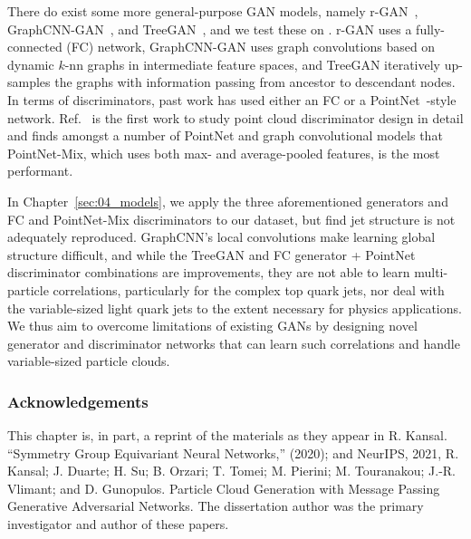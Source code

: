 There do exist some more general-purpose GAN models, namely r-GAN~\cite{rgan}, GraphCNN-GAN~\cite{graphcnngan}, and TreeGAN~\cite{treegan}, and we test these on \jetnet.
r-GAN uses a fully-connected (FC) network, GraphCNN-GAN uses graph convolutions based on dynamic $k$-nn graphs in intermediate feature spaces, and TreeGAN iteratively up-samples the graphs with information passing from ancestor to descendant nodes.
In terms of discriminators, past work has used either an FC or a PointNet~\cite{pointnet}-style network.
Ref.~\cite{wang2020rethinking} is the first work to study point cloud discriminator design in detail and finds amongst a number of PointNet and graph convolutional models that PointNet-Mix, which uses both max- and average-pooled features, is the most performant.

In Chapter~\ref{sec:04_models}, we apply the three aforementioned generators and FC and PointNet-Mix discriminators to our dataset, but find jet structure is not adequately reproduced. 
GraphCNN's local convolutions make learning global structure difficult, and while the TreeGAN and FC generator + PointNet discriminator combinations are improvements, they are not able to learn multi-particle correlations, particularly for the complex top quark jets, nor deal with the variable-sized light quark jets to the extent necessary for physics applications.
We thus aim to overcome limitations of existing GANs by designing novel generator and discriminator networks that can learn such correlations and handle variable-sized particle clouds. 

\subsubsection{Acknowledgements}

This chapter is, in part, a reprint of the materials as they appear in
R. Kansal. ``Symmetry Group Equivariant Neural Networks,'' (2020);
and
NeurIPS, 2021, R. Kansal; J. Duarte; H. Su; B. Orzari; T. Tomei; M. Pierini; M. Touranakou; J.-R. Vlimant; and D. Gunopulos. Particle Cloud Generation with Message Passing Generative Adversarial Networks.
The dissertation author was the primary investigator and author of these papers.